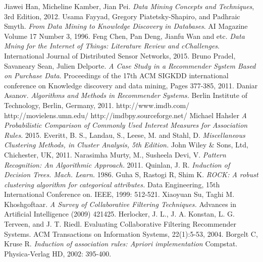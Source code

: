 \documentclass[conference]{IEEEtran}
\begin{document}
%
%
%
\begin{thebibliography}{10}
Jiawei Han, Micheline Kamber, Jian Pei. \emph{Data Mining Concepts and Techniques}, 3rd Edition, 2012.
Usama Fayyad, Gregory Piatetsky-Shapiro, and Padhraic Smyth. \emph{From Data Mining to Knowledge Discovery in Databases}. AI Magazine Volume 17 Number 3, 1996.
Feng Chen, Pan Deng, Jianfu Wan and etc. \emph{Data Mning for the Internet of Things: Literature Review and cChallenges}. International Journal of Distributed Sensor Networks, 2015.
Bruno Pradel, Savaneary Sean,  Julien Delporte. \emph{A Case Study in a Recommender System Based on Purchase Data}. Proceedings of the 17th ACM SIGKDD international conference on Knowledge discovery and data mining, Pages 377-385, 2011.
Daniar Asanov. \emph{Algorithms and Methods in Recommender Systems.} Berlin Institute of Technology, Berlin, Germany, 2011.
http://www.imdb.com/
http://movielens.umn.edu/ 
http://imdbpy.sourceforge.net/
Michael Hahsler \emph{A Probabilistic Comparison of Commonly Used Interest Measures for Association Rules.} 2015.
Everitt, B. S., Landau, S., Leese, M. and Stahl, D. \emph{Miscellaneous Clustering Methods, in Cluster Analysis, 5th Edition.} John Wiley \& Sons, Ltd, Chichester, UK, 2011.
 Narasimha Murty, M., Susheela Devi, V. \emph{Pattern Recognition: An Algorithmic Approach.} 2011.
 Quinlan, J. R. \emph{ Induction of Decision Trees. Mach. Learn. } 1986.
 Guha S, Rastogi R, Shim K. \emph{ROCK: A robust clustering algorithm for categorical attributes.} Data Engineering, 15th International Conference on. IEEE, 1999: 512-521.
Xiaoyuan Su, Taghi M. Khoshgoftaar. \emph{A Survey of Collaborative Filtering Techniques.}
Advances in Artificial Intelligence (2009) 421425.
Herlocker, J. L., J. A. Konstan, L. G. Terveen, and J. T. Riedl. Evaluating Collaborative
Filtering Recommender Systems. ACM Transactions on Information Systems, 22(1):5-53,
2004. 
Borgelt C, Kruse R. \emph{Induction of association rules: Apriori implementation} Compstat. Physica-Verlag HD, 2002: 395-400.

\end{thebibliography}




\end{document}
